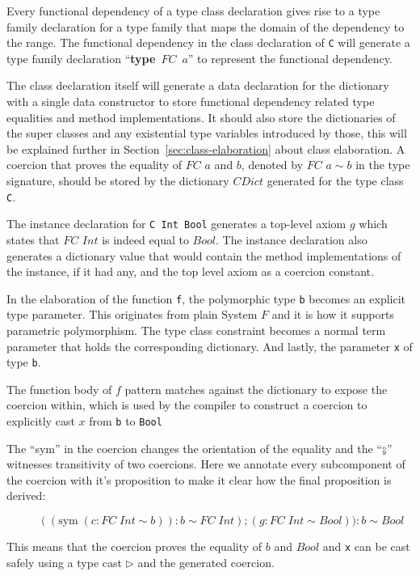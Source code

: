 Every functional dependency of a type class declaration gives rise to a type
family declaration for a type family that maps the domain of the dependency to
the range.  The functional dependency in the class declaration of \texttt{C}
will generate a type family declaration ``\textbf{type}~$FC$~$a$'' to represent
the functional dependency.

The class declaration itself will generate a data declaration for the dictionary
with a single data constructor to store functional dependency related type
equalities and method implementations. It should also store the dictionaries of
the super classes and any existential type variables introduced by those, this
will be explained further in Section~\ref{sec:class-elaboration} about class
elaboration. A coercion that proves the equality of $FC$ $a$ and $b$, denoted by
$FC$ $a \sim b$ in the type signature, should be stored by the dictionary
$CDict$ generated for the type class \texttt{C}.

The instance declaration for \texttt{C Int Bool} generates a top-level axiom
$g$ which states that $FC$ $Int$ is indeed equal to $Bool$. The instance
declaration also generates a dictionary value that would contain the method
implementations of the instance, if it had any, and the top
level axiom as a coercion constant.

In the elaboration of the function \texttt{f}, the polymorphic type \texttt{b}
becomes an explicit type parameter. This originates from plain System $F$ and it
is how it supports parametric polymorphism. The type class constraint becomes a
normal term parameter that holds the corresponding dictionary. And lastly, the
parameter \texttt{x} of type \texttt{b}.

The function body of $f$ pattern matches against the dictionary to expose the
coercion within, which is used by the compiler to construct a coercion to
explicitly cast $x$ from \texttt{b} to \texttt{Bool}

The ``sym'' in the coercion changes the orientation of the equality and the
``$\fctrans$'' witnesses transitivity of two coercions. Here we annotate every
subcomponent of the coercion with it's proposition to make it clear how the
final proposition is derived:

\[
\quad\quad((\text{sym} \; (c : FC \; Int \sim b)) : b \sim FC \; Int) ; (g : FC
\; Int \sim Bool) ) : b \sim Bool
\]

This means that the coercion proves the equality of $b$ and $Bool$ and
\texttt{x} can be cast safely using a type cast $\triangleright$ and the
generated coercion.

